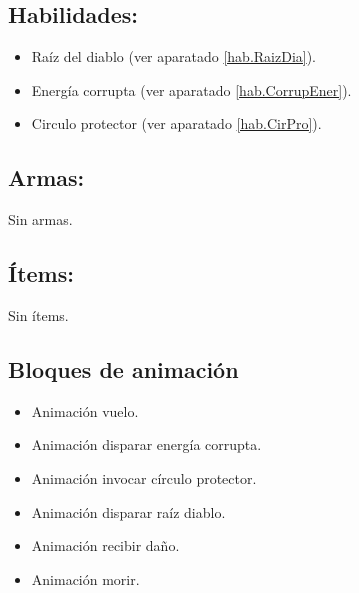 \subsection{Habilidades:}
\begin{itemize} 
	\item Raíz del diablo (ver aparatado \ref{hab.RaizDia}).
	\item Energía corrupta (ver aparatado \ref{hab.CorrupEner}).
	\item Circulo protector (ver aparatado \ref{hab.CirPro}).
\end{itemize} 
\subsection{Armas:}
Sin armas.
\subsection{Ítems:}
Sin ítems.
\subsection{Bloques de animación}
	\begin{itemize}
		\item Animación vuelo.
		\item Animación disparar energía corrupta.
		\item Animación invocar círculo protector.
		\item Animación disparar raíz diablo.
		\item Animación recibir daño.
		\item Animación morir.
	\end{itemize}